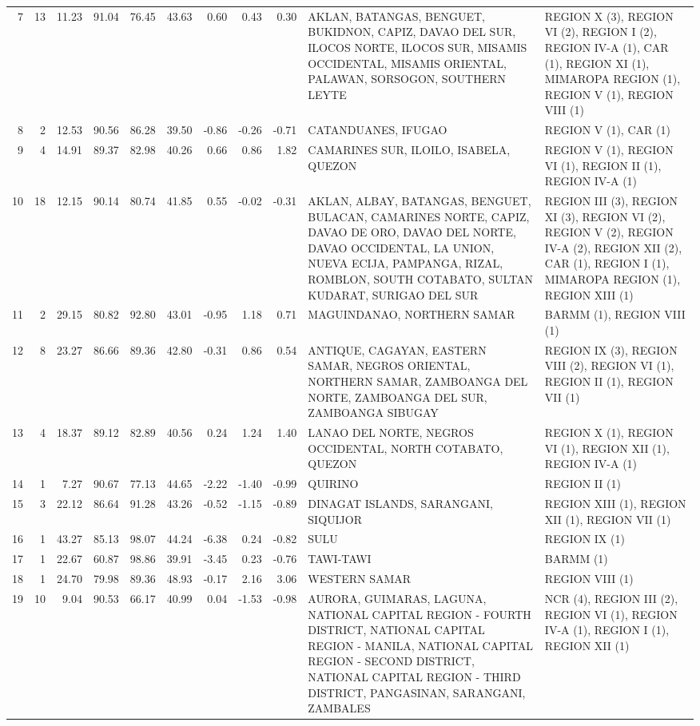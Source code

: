 \begin{tabular}{rrrrrrrrrll}
7 & 13 & 11.23 & 91.04 & 76.45 & 43.63 & 0.60 & 0.43 & 0.30 & AKLAN, BATANGAS, BENGUET, BUKIDNON, CAPIZ, DAVAO DEL SUR, ILOCOS NORTE, ILOCOS SUR, MISAMIS OCCIDENTAL, MISAMIS ORIENTAL, PALAWAN, SORSOGON, SOUTHERN LEYTE & REGION X (3), REGION VI (2), REGION I (2), REGION IV-A (1), CAR (1), REGION XI (1), MIMAROPA REGION (1), REGION V (1), REGION VIII (1) \\
8 & 2 & 12.53 & 90.56 & 86.28 & 39.50 & -0.86 & -0.26 & -0.71 & CATANDUANES, IFUGAO & REGION V (1), CAR (1) \\
9 & 4 & 14.91 & 89.37 & 82.98 & 40.26 & 0.66 & 0.86 & 1.82 & CAMARINES SUR, ILOILO, ISABELA, QUEZON & REGION V (1), REGION VI (1), REGION II (1), REGION IV-A (1) \\
10 & 18 & 12.15 & 90.14 & 80.74 & 41.85 & 0.55 & -0.02 & -0.31 & AKLAN, ALBAY, BATANGAS, BENGUET, BULACAN, CAMARINES NORTE, CAPIZ, DAVAO DE ORO, DAVAO DEL NORTE, DAVAO OCCIDENTAL, LA UNION, NUEVA ECIJA, PAMPANGA, RIZAL, ROMBLON, SOUTH COTABATO, SULTAN KUDARAT, SURIGAO DEL SUR & REGION III (3), REGION XI (3), REGION VI (2), REGION V (2), REGION IV-A (2), REGION XII (2), CAR (1), REGION I (1), MIMAROPA REGION (1), REGION XIII (1) \\
11 & 2 & 29.15 & 80.82 & 92.80 & 43.01 & -0.95 & 1.18 & 0.71 & MAGUINDANAO, NORTHERN SAMAR & BARMM (1), REGION VIII (1) \\
12 & 8 & 23.27 & 86.66 & 89.36 & 42.80 & -0.31 & 0.86 & 0.54 & ANTIQUE, CAGAYAN, EASTERN SAMAR, NEGROS ORIENTAL, NORTHERN SAMAR, ZAMBOANGA DEL NORTE, ZAMBOANGA DEL SUR, ZAMBOANGA SIBUGAY & REGION IX (3), REGION VIII (2), REGION VI (1), REGION II (1), REGION VII (1) \\
13 & 4 & 18.37 & 89.12 & 82.89 & 40.56 & 0.24 & 1.24 & 1.40 & LANAO DEL NORTE, NEGROS OCCIDENTAL, NORTH COTABATO, QUEZON & REGION X (1), REGION VI (1), REGION XII (1), REGION IV-A (1) \\
14 & 1 & 7.27 & 90.67 & 77.13 & 44.65 & -2.22 & -1.40 & -0.99 & QUIRINO & REGION II (1) \\
15 & 3 & 22.12 & 86.64 & 91.28 & 43.26 & -0.52 & -1.15 & -0.89 & DINAGAT ISLANDS, SARANGANI, SIQUIJOR & REGION XIII (1), REGION XII (1), REGION VII (1) \\
16 & 1 & 43.27 & 85.13 & 98.07 & 44.24 & -6.38 & 0.24 & -0.82 & SULU & REGION IX (1) \\
17 & 1 & 22.67 & 60.87 & 98.86 & 39.91 & -3.45 & 0.23 & -0.76 & TAWI-TAWI & BARMM (1) \\
18 & 1 & 24.70 & 79.98 & 89.36 & 48.93 & -0.17 & 2.16 & 3.06 & WESTERN SAMAR & REGION VIII (1) \\
19 & 10 & 9.04 & 90.53 & 66.17 & 40.99 & 0.04 & -1.53 & -0.98 & AURORA, GUIMARAS, LAGUNA, NATIONAL CAPITAL REGION - FOURTH DISTRICT, NATIONAL CAPITAL REGION - MANILA, NATIONAL CAPITAL REGION - SECOND DISTRICT, NATIONAL CAPITAL REGION - THIRD DISTRICT, PANGASINAN, SARANGANI, ZAMBALES & NCR (4), REGION III (2), REGION VI (1), REGION IV-A (1), REGION I (1), REGION XII (1) \\
\bottomrule
\end{tabular}

